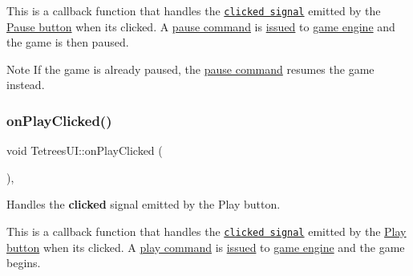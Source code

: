 This is a callback function that handles the \href{https://developer.gnome.org/gtk3/stable/GtkButton.html#GtkButton-clicked}{\tt clicked signal} emitted by the \hyperlink{TetreesUI_8cpp_a119f809cb832f3e370c60c75d766e473}{Pause button} when it\textquotesingle{}s clicked. A \hyperlink{TetreesDefs_8hpp_aadc337e2620d6621659e63e87c45e79da22507047922c1ce8c921c8d193e67126}{pause command} is \hyperlink{classTetreesEngine_aa2a283d09b0b6ab7c03ea2265a2e3438}{issued} to \hyperlink{classTetreesUI_a07faa56ea40b28beba7509fa7f65c897}{game engine} and the game is then paused. \begin{DoxyNote}{Note}
If the game is already paused, the \hyperlink{TetreesDefs_8hpp_aadc337e2620d6621659e63e87c45e79da22507047922c1ce8c921c8d193e67126}{pause command} resumes the game instead. 
\end{DoxyNote}
\mbox{\label{classTetreesUI_a0aa1932ac8f09f6d8de7ac7d7a2efa94}} 
\subsubsection{\texorpdfstring{on\+Play\+Clicked()}{onPlayClicked()}}
{\footnotesize\ttfamily void Tetrees\+U\+I\+::on\+Play\+Clicked (\begin{DoxyParamCaption}{ }\end{DoxyParamCaption})\hspace{0.3cm}{\ttfamily [static]}, {\ttfamily [private]}}



Handles the {\bfseries clicked} signal emitted by the Play button. 

This is a callback function that handles the \href{https://developer.gnome.org/gtk3/stable/GtkButton.html#GtkButton-clicked}{\tt clicked signal} emitted by the \hyperlink{TetreesUI_8cpp_a93e046be1258b131010c58072aab2ead}{Play button} when it\textquotesingle{}s clicked. A \hyperlink{TetreesDefs_8hpp_aadc337e2620d6621659e63e87c45e79da1fbb60a5fbb790c7be80c6f085cb6287}{play command} is \hyperlink{classTetreesEngine_aa2a283d09b0b6ab7c03ea2265a2e3438}{issued} to \hyperlink{classTetreesUI_a07faa56ea40b28beba7509fa7f65c897}{game engine} and the game begins. \mbox{\label{classTetreesUI_a587ff52a2c843c4d331f329f4b94ddbd}} 

